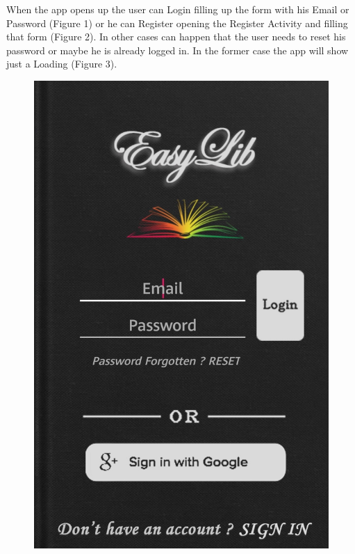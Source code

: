 \vspace{5mm}
When the app opens up the user can Login filling up the form with his Email or Password (Figure 1) or he can Register opening the Register Activity and filling that form (Figure 2). In other cases can happen that the user needs to reset his password or maybe he is already logged in. In the former case the app will show just a Loading (Figure 3).
\begin{figure}[H]
	\centering
	\includegraphics[scale=0.15]{Images/UI/Login_Register/1}
	\hspace{0.5cm}

\end{figure}
